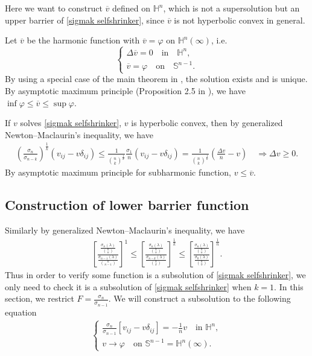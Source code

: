 \documentclass[reqno]{amsart}
\theoremstyle{remark}
\theoremstyle{definition}
\numberwithin{equation}{section}
\begin{document}
Here we want to construct $\overline{v}$ defined on $\mathbb{H}^n$, which is not a supersolution but an upper barrier of \eqref{sigmak selfshrinker}, since $\overline{v}$ is not hyperbolic convex in general. 

Let $\overline{v}$ be the harmonic function with $\overline{v} = \varphi$ on $\mathbb{H}^{n}(\infty)$, i.e.
\[
\begin{cases}
    \Delta \overline{v} = 0 \quad \text{in} \quad \mathbb{H}^{n}, \\
    \overline{v} = \varphi \quad \text{on} \quad \mathbb{S}^{n-1}. 
\end{cases}
\]
By using a special case of the main theorem in \cite{Anderson}, the solution exists and is unique. By asymptotic maximum principle (Proposition 2.5 in \cite{Choi}), we have $\inf \varphi \leqslant \overline{v} \leqslant \sup \varphi$. 

If $v$ solves \eqref{sigmak selfshrinker}, $v$ is hyperbolic convex, then by generalized Newton--Maclaurin's inequality, we have
\begin{align*}
    \left( \frac{\sigma_n}{\sigma_{n-k}} \right)^{\frac{1}{k}} \left( v_{ij}-v\delta_{ij} \right) \leqslant \frac{1}{\binom{n}{k}^{\frac{1}{k}}} \frac{\sigma_1}{n} \left( v_{ij}-v\delta_{ij} \right)
    = \frac{1}{\binom{n}{k}^{\frac{1}{k}}} \left( \frac{\Delta v}{n} - v \right) \quad \Rightarrow \Delta v \geqslant 0.
\end{align*}
By asymptotic maximum principle for subharmonic function, $v \leqslant \overline{v}$. 


\subsection{Construction of lower barrier function}

Similarly by generalized Newton--Maclaurin's inequality, we have
\begin{align}
    \left[ \frac{\frac{\sigma_n (\lambda)}{\binom{n}{n}}}{\frac{\sigma_{n-1} (\lambda)}{\binom{n}{n-1}}} \right]^{1} \leqslant \left[ \frac{\frac{\sigma_n (\lambda)}{\binom{n}{n}}}{\frac{\sigma_{n-k} (\lambda)}{\binom{n}{k}}} \right]^{\frac{1}{k}}
    \leqslant \left[ \frac{\frac{\sigma_n (\lambda)}{\binom{n}{n}}}{\frac{\sigma_0 (\lambda)}{\binom{n}{0}}} \right]^{\frac{1}{n}}.
\end{align}
Thus in order to verify some function is a subsolution of \eqref{sigmak selfshrinker}, we only need to check it is a subsolution of \eqref{sigmak selfshrinker} when $k=1$. In this section, we restrict $F=\frac{\sigma_n}{\sigma_{n-1}}$. We will construct a subsolution to the following equation
\begin{align}
    \begin{cases}
        \frac{\sigma_n}{\sigma_{n-1}} \left[v_{ij}-v\delta_{ij}\right] = -\frac{1}{n} v \quad \text{in } \mathbb{H}^{n}, \\
        v \rightarrow \varphi \quad \text{on } \mathbb{S}^{n-1} = \mathbb{H}^{n}(\infty). \label{k=1 selfshrinker}
    \end{cases}
\end{align}
\end{document}
